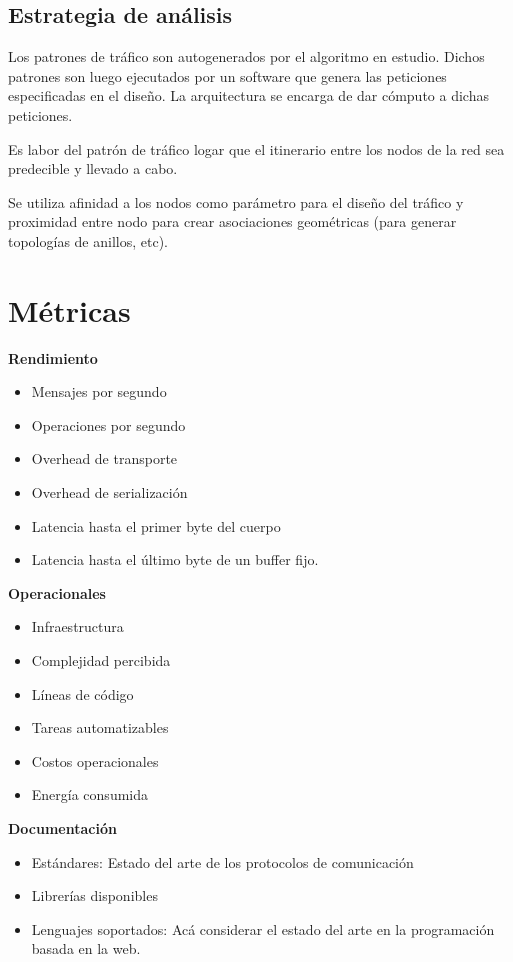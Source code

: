 \subsection{Estrategia de análisis}

Los patrones de tráfico son autogenerados por el algoritmo en estudio. Dichos patrones son luego ejecutados por un software que genera las peticiones especificadas en el diseño. La arquitectura se encarga de dar cómputo a dichas peticiones.

Es labor del patrón de tráfico logar que el itinerario entre los nodos de la red sea predecible y llevado a cabo.

Se utiliza afinidad a los nodos como parámetro para el diseño del tráfico y proximidad entre nodo para crear asociaciones geométricas (para generar topologías de anillos, etc).

\section{Métricas} %
\label{sec:métricas}



\textbf{Rendimiento}

\begin{itemize}
  \item Mensajes por segundo
  \item Operaciones por segundo
  \item Overhead de transporte
  \item Overhead de serialización
  \item Latencia hasta el primer byte del cuerpo
  \item Latencia hasta el último byte de un buffer fijo.
\end{itemize}

\textbf{Operacionales}
\begin{itemize}
  \item Infraestructura
  \item Complejidad percibida
  \item Líneas de código
  \item Tareas automatizables
  \item Costos operacionales
  \item Energía consumida
\end{itemize}

\textbf{Documentación}
\begin{itemize}
  \item Estándares: Estado del arte de los protocolos de comunicación
  \item Librerías disponibles
  \item Lenguajes soportados: Acá considerar el estado del arte en la programación basada en la web.
\end{itemize}
